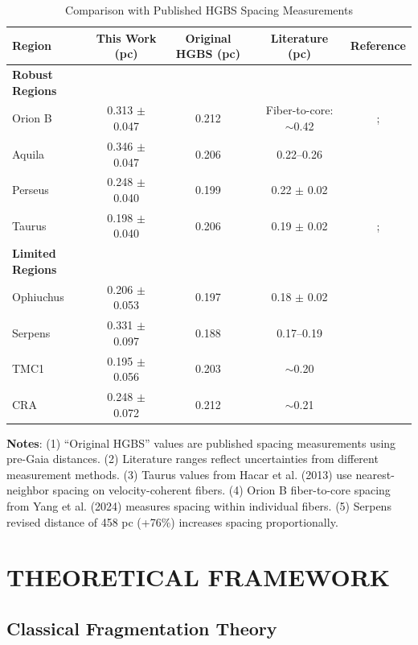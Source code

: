 \documentclass[twocolumn]{mnras}
\begin{document}
\begin{table}
\caption{Comparison with Published HGBS Spacing Measurements}
\label{tab:literature}
\begin{tabular}{lcccc}
\toprule
Region & This Work (pc) & Original HGBS (pc) & Literature (pc) & Reference \\
\midrule
\textbf{Robust Regions} &  &  &  &  \\
Orion B & 0.313 $\pm$ 0.047 & 0.212 & Fiber-to-core: $\sim$0.42 & \citet{Konyves2020}; \citet{Yang2024} \\
Aquila  & 0.346 $\pm$ 0.047 & 0.206 & 0.22--0.26 & \citet{Konyves2015} \\
Perseus & 0.248 $\pm$ 0.040 & 0.199 & 0.22 $\pm$ 0.02 & \citet{Andre2016} \\
Taurus  & 0.198 $\pm$ 0.040 & 0.206 & 0.19 $\pm$ 0.02 & \citet{Hacar2013}; \citet{Schmiedeke2021} \\
\midrule
\textbf{Limited Regions} &  &  &  &  \\
Ophiuchus & 0.206 $\pm$ 0.053 & 0.197 & 0.18 $\pm$ 0.02 & \citet{Konyves2020} \\
Serpens  & 0.331 $\pm$ 0.097 & 0.188 & 0.17--0.19 & \citet{Konyves2020} \\
TMC1     & 0.195 $\pm$ 0.056 & 0.203 & $\sim$0.20 & \citet{Hacar2013} \\
CRA      & 0.248 $\pm$ 0.072 & 0.212 & $\sim$0.21 & \citet{Konyves2020} \\
\bottomrule
\end{tabular}

\vspace{0.1in}
\footnotesize
\textbf{Notes}: (1) ``Original HGBS'' values are published spacing measurements using pre-Gaia distances. (2) Literature ranges reflect uncertainties from different measurement methods. (3) Taurus values from Hacar et al. (2013) use nearest-neighbor spacing on velocity-coherent fibers. (4) Orion B fiber-to-core spacing from Yang et al. (2024) measures spacing within individual fibers. (5) Serpens revised distance of 458 pc (+76\%) increases spacing proportionally.
\end{table}

\section{THEORETICAL FRAMEWORK}

\subsection{Classical Fragmentation Theory}
\end{document}

